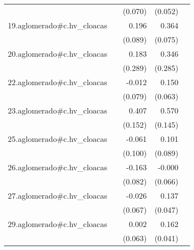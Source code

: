{\begin{longtable}{l*{4}{D{.}{.}{-1}}}
            &                     &     (0.070)         &     (0.052)         &                     \\
\addlinespace
19.aglomerado#c.hv\_cloacas&                     &       0.196\sym{*}  &       0.364\sym{***}&                     \\
            &                     &     (0.089)         &     (0.075)         &                     \\
\addlinespace
20.aglomerado#c.hv\_cloacas&                     &       0.183         &       0.346         &                     \\
            &                     &     (0.289)         &     (0.285)         &                     \\
\addlinespace
22.aglomerado#c.hv\_cloacas&                     &      -0.012         &       0.150\sym{*}  &                     \\
            &                     &     (0.079)         &     (0.063)         &                     \\
\addlinespace
23.aglomerado#c.hv\_cloacas&                     &       0.407\sym{**} &       0.570\sym{***}&                     \\
            &                     &     (0.152)         &     (0.145)         &                     \\
\addlinespace
25.aglomerado#c.hv\_cloacas&                     &      -0.061         &       0.101         &                     \\
            &                     &     (0.100)         &     (0.089)         &                     \\
\addlinespace
26.aglomerado#c.hv\_cloacas&                     &      -0.163\sym{*}  &      -0.000         &                     \\
            &                     &     (0.082)         &     (0.066)         &                     \\
\addlinespace
27.aglomerado#c.hv\_cloacas&                     &      -0.026         &       0.137\sym{**} &                     \\
            &                     &     (0.067)         &     (0.047)         &                     \\
\addlinespace
29.aglomerado#c.hv\_cloacas&                     &       0.002         &       0.162\sym{***}&                     \\
            &                     &     (0.063)         &     (0.041)         &                     \\

\end{longtable}}
